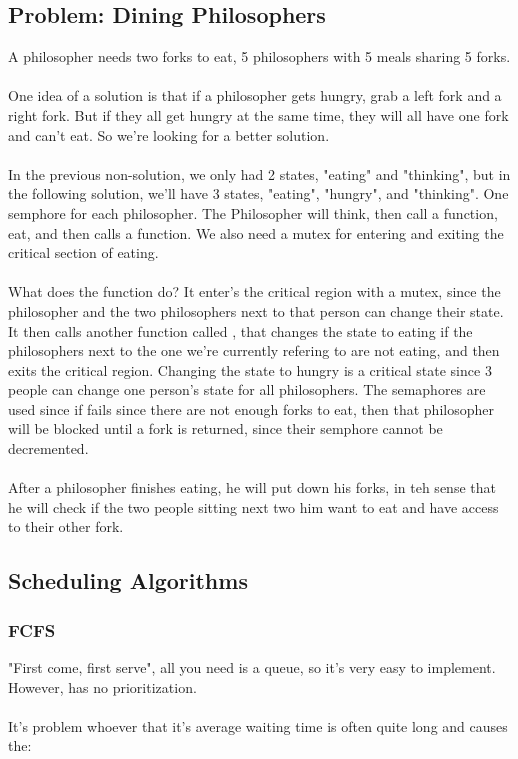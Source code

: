 \documentclass{article}
\begin{document}
\subsection{Problem: Dining Philosophers}

A philosopher needs two forks to eat, 5 philosophers with 5 meals sharing 5 forks.
\\
\\
One idea of a solution is that if a philosopher gets hungry, grab a left fork and a right fork. But if they all get hungry at the same time, they will all have one fork and can't eat. So we're looking for a better solution.
\\
\\
In the previous non-solution, we only had 2 states, "eating" and "thinking", but in the following solution, we'll have 3 states, "eating", "hungry", and "thinking". One semphore for each philosopher. The Philosopher will think, then call a  function, eat, and then calls a  function. We also need a mutex for entering and exiting the critical section of eating.\\
\\
What does the  function do? It enter's the critical region with a mutex, since the philosopher and the two philosophers next to that person can change their state. It then calls another function called , that changes the state to eating if the philosophers next to the one we're currently refering to are not eating, and then exits the critical region. Changing the state to hungry is a critical state since 3 people can change one person's state for all philosophers. The semaphores are used since if  fails since there are not enough forks to eat, then that philosopher will be blocked until a fork is returned, since their semphore cannot be decremented.\\
\\
After a philosopher finishes eating, he will put down his forks, in teh sense that he will check if the two people sitting next two him want to eat and have access to their other fork.

\subsection{Scheduling Algorithms}
\subsubsection{FCFS}
"First come, first serve", all you need is a queue, so it's very easy to implement. However, has no prioritization.\\
\\
It's problem whoever that it's average waiting time is often quite long and causes the:
\end{document}
